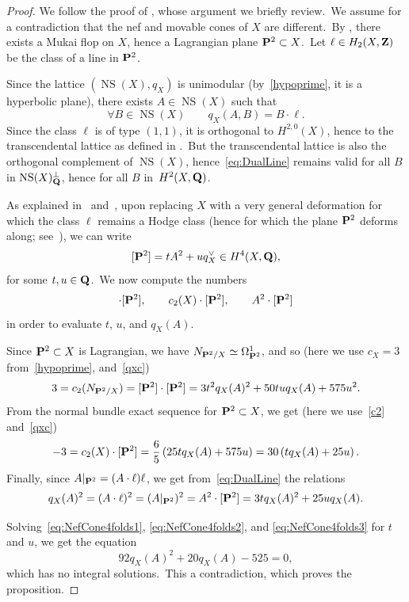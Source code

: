 \documentclass[12pt]{amsart}
\def\Z{{\bf Z}}
\def\Q{{\bf Q}}
\def\P{{\bf P}}
\def\PP{{\bf P}}
\DeclareMathOperator{\NS}{NS}
\def\isom{\simeq}
\def\cong{\isom}
\theoremstyle{remark}
\begin{document}
\begin{proof}
We follow the proof of \cite[Theorem~22]{hats}, whose argument we briefly review.\
We assume for a contradiction that the nef and movable cones of $X$ are different.\
By \cite[Theorem 1.1]{wiwi}, there exists a Mukai flop on $X$, hence a Lagrangian plane $\P^2\subset X$.\
Let $\ell\in H_2(X,\Z)$ be the class of a line in $ \PP^2$.

Since the lattice $(\NS(X),q_X)$ is unimodular (by~\eqref{hypoprime}, it is a hyperbolic plane), there exists \mbox{$A\in\NS(X)$} such that
\begin{equation}\label{eq:DualLine}
\forall B\in  \NS(X)\qquad q_X(A,B) =  B\cdot \ell.
\end{equation}
Since the class $\ell$ is of type $(1,1)$, it is orthogonal to $H^{2,0}(X)$, hence to the transcendental lattice  as defined in \cite[Definition~3.2.5]{huyk3}.\
But the transcendental lattice is also the orthogonal complement of $\NS(X)$, hence~\eqref{eq:DualLine} remains valid for all $B$ in $\NS(X)^\perp_\Q$, hence for all $B$ in~$H^2(X,\Q)$.

As explained in~\cite[(8)]{hats} and~\cite[Section~3]{og1}, upon replacing $X$ with a very general deformation for which the class $\ell$ remains a Hodge class (hence for which the plane $\P^2$ deforms along; see~\cite{voi}), we can write
\[
[\P^2] = t A^2 + u q_X^\vee \in H^4(X,\Q),
\]
for some $t,u\in\Q$.\
We now compute the numbers
\begin{equation*}
[\P^2]\cdot[\P^2],\qquad c_2(X)\cdot [\P^2],\qquad A^2\cdot [\P^2]
\end{equation*}
in order to evaluate $t$, $u$, and $q_X(A)$.\

Since $\P^2\subset X$ is Lagrangian, we have $N_{\P^2/X}\cong\Omega^1_{\P^2}$, and so (here we use $c_X=3$ from~\eqref{hypoprime}, and~\eqref{qxc})
\begin{equation}\label{eq:NefCone4folds1}
3 = c_2(N_{\P^2/X}) = [\P^2]\cdot [\P^2] = 3 t^2 q_X(A)^2 + 50 t u q_X(A) + 575 u^2.
\end{equation}
From the normal bundle exact sequence for $\P^2\subset X$, we get (here we use~\eqref{c2} and~\eqref{qxc})
\begin{equation}\label{eq:NefCone4folds2}
-3 = c_2(X)\cdot [\P^2] = \frac 65 \left( 25 t q_X(A) + 575 u \right)= 30 \left(t q_X(A) +  25 u \right).
\end{equation}
Finally, since $A\vert_{\P^2} = (A\cdot \ell)\ell$, we get from~\eqref{eq:DualLine} the relations
\begin{equation}\label{eq:NefCone4folds3}
q_X(A)^2  =  (A\cdot \ell)^2=  (A\vert_{\P^2})^2 = A^2\cdot [\P^2] =  3 t q_X(A)^2 + 25 u q_X(A).
\end{equation}

Solving~\eqref{eq:NefCone4folds1}, \eqref{eq:NefCone4folds2}, and \eqref{eq:NefCone4folds3} for $t$ and $u$, we get the equation
\[
92 q_X(A)^2 + 20  q_X(A) - 525 = 0,
\]
which has no integral solutions.\
This a contradiction, which proves the proposition.
\end{proof}
\end{document}

